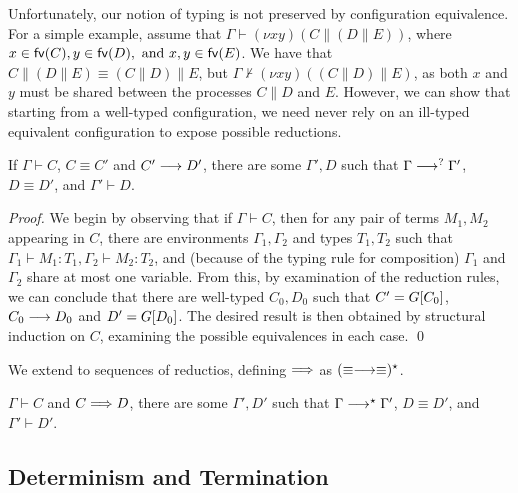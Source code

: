 \documentclass[oribibl,orivec,envcountsame]{llncs}
\begin{document}
Unfortunately, our notion of typing is not preserved by configuration equivalence.  For a simple
example, assume that $\Gamma \vdash (\nu x y)(C \parallel (D \parallel E))$, where $x \in \mathsf{fv}(C), y
\in \mathsf{fv}(D), \text{ and } x,y \in \mathsf{fv}(E)$.  We have that $C \parallel (D \parallel E) \equiv
(C \parallel D) \parallel E$, but $\Gamma \nvdash (\nu x y)((C \parallel D) \parallel E)$, as both
$x$ and $y$ must be shared between the processes $C \parallel D$ and $E$.  However, we can show that
starting from a well-typed configuration, we need never rely on an ill-typed equivalent
configuration to expose possible reductions.
%
\begin{theorem}\label{thm:preservation-equiv}
  If $\Gamma \vdash C$, $C \equiv C'$ and $C' \longrightarrow D'$, there are some $\Gamma',D$ such that
  $\Gamma \longrightarrow^? \Gamma'$, $D \equiv D'$, and $\Gamma' \vdash D$.
\end{theorem}
%
\begin{proof}
  We begin by observing that if $\Gamma \vdash C$, then for any pair of terms $M_1, M_2$ appearing
  in $C$, there are environments $\Gamma_1,\Gamma_2$ and types $T_1,T_2$ such that $\Gamma_1 \vdash
  M_1 : T_1,\Gamma_2 \vdash M_2 : T_2$, and (because of the typing rule for composition) $\Gamma_1$
  and $\Gamma_2$ share at most one variable.  From this, by examination of the reduction rules, we
  can conclude that there are well-typed $C_0,D_0$ such that $C' = G[C_0]$, $C_0 \longrightarrow D_0$ and
  $D' = G[D_0]$.  The desired result is then obtained by structural induction on $C$, examining
  the possible equivalences in each case. \qed
\end{proof}
%
We extend  to sequences of reductios, defining $\Longrightarrow$ as
$(\equiv\longrightarrow\equiv)^\star$.
%
\begin{corollary}
  $\Gamma \vdash C$ and $C \Longrightarrow D$, there are some $\Gamma',D'$ such that $\Gamma
  \longrightarrow^\star \Gamma'$, $D \equiv D'$, and $\Gamma' \vdash D'$.
\end{corollary}

\subsection{Determinism and Termination}\label{sec:determinism}
\end{document}
